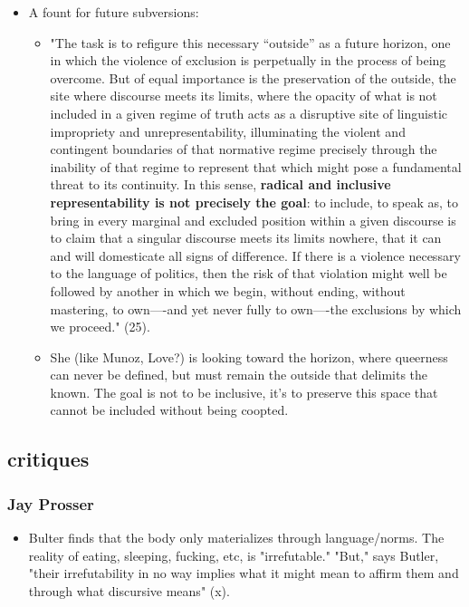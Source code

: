\documentclass[11pt]{article}
\begin{document}
\begin{itemize}
\item A fount for future subversions:
\begin{itemize}
\item "The task is to refigure this necessary “outside” as a future
horizon, one in which the violence of exclusion is perpetually in
the process of being overcome. But of equal importance is the
preservation of the outside, the site where discourse meets its
limits, where the opacity of what is not included in a given regime
of truth acts as a disruptive site of linguistic impropriety and
unrepresentability, illuminating the violent and contingent
boundaries of that normative regime precisely through the inability
of that regime to represent that which might pose a fundamental
threat to its continuity. In this sense, \textbf{radical and inclusive
representability is not precisely the goal}: to include, to speak
as, to bring in every marginal and excluded position within a given
discourse is to claim that a singular discourse meets its limits
nowhere, that it can and will domesticate all signs of difference.
If there is a violence necessary to the language of politics, then
the risk of that violation might well be followed by another in
which we begin, without ending, without mastering, to own—-and yet
never fully to own—-the exclusions by which we proceed." (25).
\item She (like Munoz, Love?) is looking toward the horizon, where
queerness can never be defined, but must remain the outside that
delimits the known. The goal is not to be inclusive, it's to
preserve this space that cannot be included without being coopted.
\end{itemize}
\end{itemize}

\subsection{critiques}
\label{sec:org8ceab4e}
\subsubsection{Jay Prosser}
\label{sec:org41276bf}
\begin{itemize}
\item Bulter finds that the body only materializes through language/norms.
The reality of eating, sleeping, fucking, etc, is "irrefutable."
"But," says Butler, "their irrefutability in no way implies what it
might mean to affirm them and through what discursive means" (x).
\end{itemize}
\end{document}
